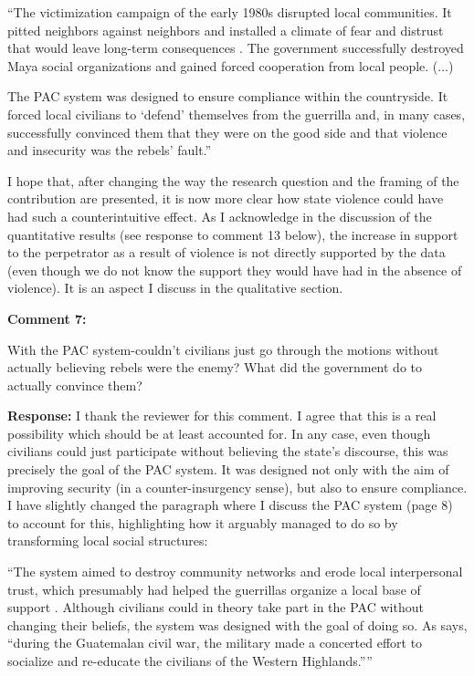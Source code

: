 \documentclass[12pt, a4paper, notitlepage]{article}
\begin{document}
``The victimization campaign of the early 1980s disrupted local communities. It pitted neighbors against neighbors and installed a climate of fear and distrust that would leave long-term consequences \citep{Burrell:2013aa}.
The government successfully destroyed Maya social organizations and gained forced cooperation from local people. (...)

The PAC system was designed to ensure compliance within the countryside.
It forced local civilians to `defend' themselves from the guerrilla and, in many cases, successfully convinced them that they were on the good side and that violence and insecurity was the rebels' fault.''

I hope that, after changing the way the research question and the framing of the contribution are presented, it is now more clear how state violence could have had such a counterintuitive effect. As I acknowledge in the discussion of the quantitative results (see response to comment 13 below), the increase in support to the perpetrator as a result of violence is not directly supported by the data (even though we do not know the support they would have had in the absence of violence).
It is an aspect I discuss in the qualitative section.

\vspace{15pt}
\noindent\textbf{Comment 7:}
\begin{displayquote}
With the PAC system-couldn't civilians just go through the motions without actually believing rebels were the enemy? What did the government do to actually convince them?
\end{displayquote}

\noindent\textbf{Response:} I thank the reviewer for this comment.
I agree that this is a real possibility which should be at least accounted for.
In any case, even though civilians could just participate without believing the state's discourse, this was precisely the goal of the PAC system.
It was designed not only with the aim of improving security (in a counter-insurgency sense), but also to ensure compliance. I have slightly changed the paragraph where I discuss the PAC system (page 8) to account for this, highlighting how it arguably managed to do so by transforming local social structures:

``The system aimed to destroy community networks and erode local interpersonal trust, which presumably had helped the guerrillas organize a local base of support \citep{SaenzdeTejada:2004aa}.
Although civilians could in theory take part in the PAC without changing their beliefs, the system was designed with the goal of doing so.
As \citet[641]{Bateson:2017aa} says, ``during the Guatemalan civil war, the military made a concerted effort to socialize and re-educate the civilians of the Western Highlands.''''
\end{document}
